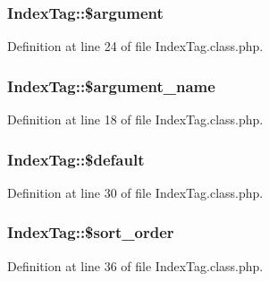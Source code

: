\subsubsection[{\$argument}]{\setlength{\rightskip}{0pt plus 5cm}Index\+Tag\+::\$argument}\label{classIndexTag_a5d1d862f8c1ebcd6ddb15bb2c9da2e4b}


Definition at line 24 of file Index\+Tag.\+class.\+php.

\hypertarget{classIndexTag_a92f6892b11fed081293fdaabb58f36a0}{}
\subsubsection[{\$argument\+\_\+name}]{\setlength{\rightskip}{0pt plus 5cm}Index\+Tag\+::\$argument\+\_\+name}\label{classIndexTag_a92f6892b11fed081293fdaabb58f36a0}


Definition at line 18 of file Index\+Tag.\+class.\+php.

\hypertarget{classIndexTag_ae24a36bb56ebc33a9161a64b12f92f18}{}
\subsubsection[{\$default}]{\setlength{\rightskip}{0pt plus 5cm}Index\+Tag\+::\$default}\label{classIndexTag_ae24a36bb56ebc33a9161a64b12f92f18}


Definition at line 30 of file Index\+Tag.\+class.\+php.

\hypertarget{classIndexTag_a68336fd5e6a3fa09e2659359cce027fb}{}
\subsubsection[{\$sort\+\_\+order}]{\setlength{\rightskip}{0pt plus 5cm}Index\+Tag\+::\$sort\+\_\+order}\label{classIndexTag_a68336fd5e6a3fa09e2659359cce027fb}


Definition at line 36 of file Index\+Tag.\+class.\+php.

\hypertarget{classIndexTag_af25bb5754a767188b72ee872e35414e6}{}
